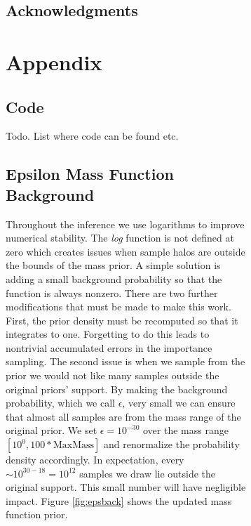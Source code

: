 \documentclass[\docopts]{\docclass}
\begin{document}
\begin{figure}[h!]
\begin{figure}[h!]



\subsection*{Acknowledgments}








\newpage

\section{Appendix}
\label{sec:appendix}

\subsection{Code}
\label{subsec:code}

Todo. List where code can be found etc.

\subsection{Epsilon Mass Function Background}
\label{subsec:epsilon_back}
Throughout the inference we use logarithms to improve numerical stability.
The \emph{log} function is not defined at zero which creates issues when sample halos are outside the bounds of the mass prior. 
A simple solution is adding a small background probability so that the function is always nonzero. 
There are two further modifications that must be made to make this work. 
First, the prior density must be recomputed so that it integrates to one.
Forgetting to do this leads to nontrivial accumulated errors in the importance sampling.
The second issue is when we sample from the prior we would not like many samples outside the original priors' support.
By making the background probability, which we call $\epsilon$, very small we can ensure that almost all samples are from the mass range of the original prior. 
We set $\epsilon = 10^{-30}$ over the mass range $[10^0, 100 * \text{MaxMass}]$ and renormalize the probability density accordingly.
In expectation, every $\sim 10^{30-18} = 10^{12}$ samples we draw lie outside the original support.
This small number will have negligible impact.
Figure \ref{fig:epsback} shows the updated mass function prior.


\end{figure}
\end{figure}
\end{document}
